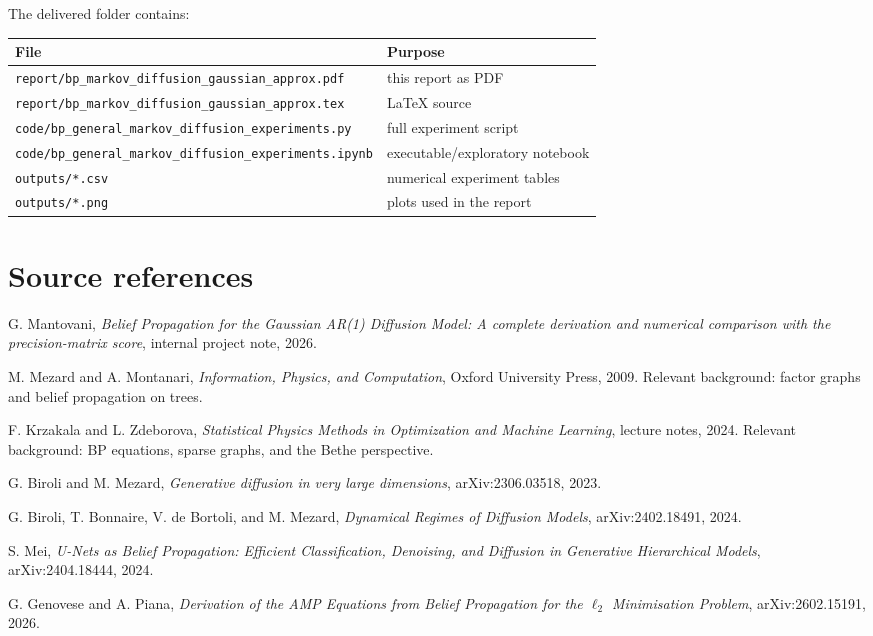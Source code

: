 \documentclass[11pt]{article}
\begin{document}
The delivered folder contains:
\begin{center}
\begin{tabular}{ll}
\toprule
File & Purpose \\
\midrule
\texttt{report/bp\_markov\_diffusion\_gaussian\_approx.pdf} & this report as PDF \\
\texttt{report/bp\_markov\_diffusion\_gaussian\_approx.tex} & LaTeX source \\
\texttt{code/bp\_general\_markov\_diffusion\_experiments.py} & full experiment script \\
\texttt{code/bp\_general\_markov\_diffusion\_experiments.ipynb} & executable/exploratory notebook \\
\texttt{outputs/*.csv} & numerical experiment tables \\
\texttt{outputs/*.png} & plots used in the report \\
\bottomrule
\end{tabular}
\end{center}

\section{Source references}

\begin{thebibliography}{9}

G. Mantovani, \emph{Belief Propagation for the Gaussian AR(1) Diffusion Model: A complete derivation and numerical comparison with the precision-matrix score}, internal project note, 2026.

M. Mezard and A. Montanari, \emph{Information, Physics, and Computation}, Oxford University Press, 2009. Relevant background: factor graphs and belief propagation on trees.

F. Krzakala and L. Zdeborova, \emph{Statistical Physics Methods in Optimization and Machine Learning}, lecture notes, 2024. Relevant background: BP equations, sparse graphs, and the Bethe perspective.

G. Biroli and M. Mezard, \emph{Generative diffusion in very large dimensions}, arXiv:2306.03518, 2023.

G. Biroli, T. Bonnaire, V. de Bortoli, and M. Mezard, \emph{Dynamical Regimes of Diffusion Models}, arXiv:2402.18491, 2024.

S. Mei, \emph{U-Nets as Belief Propagation: Efficient Classification, Denoising, and Diffusion in Generative Hierarchical Models}, arXiv:2404.18444, 2024.

G. Genovese and A. Piana, \emph{Derivation of the AMP Equations from Belief Propagation for the \(\ell_2\) Minimisation Problem}, arXiv:2602.15191, 2026.

\end{thebibliography}
\end{document}
